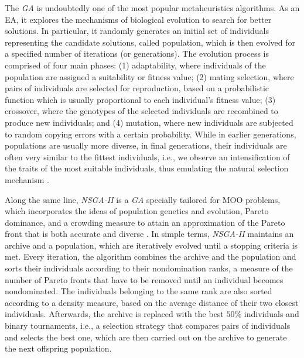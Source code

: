 	The \textit{\ac{GA}} is undoubtedly one of the most popular metaheuristics algorithms. As an \ac{EA}, it explores the mechanisms of biological evolution to search for better solutions. In particular, it randomly generates an initial set of individuals representing the candidate solutions, called population, which is then evolved for a specified number of iterations (or generations). The evolution process is comprised of four main phases: (1) adaptability, where individuals of the population are assigned a suitability or fitness value; (2) mating selection, where pairs of individuals are selected for reproduction, based on a probabilistic function which is usually proportional to each individual's fitness value; (3) crossover, where the genotypes of the selected individuals are recombined to produce new individuals; and (4) mutation, where new individuals are subjected to random copying errors with a certain probability. While in earlier generations, populations are usually more diverse, in final generations, their individuals are often very similar to the fittest individuals, i.e., we observe an intensification of the traits of the most suitable individuals, thus emulating the natural selection mechanism \cite{Brownlee2011}. %
	
	Along the same line, \textit{\ac{NSGA-II}} is a \textit{\ac{GA}} specially tailored for \ac{MOO} problems, which incorporates the ideas of population genetics and evolution, Pareto dominance, and a crowding measure to attain an approximation of the Pareto front that is both accurate and diverse \cite{Deb2002}. In simple terms, \textit{\ac{NSGA-II}} maintains an archive and a population, which are iteratively evolved until a stopping criteria is met. Every iteration, the algorithm combines the archive and the population and sorts their individuals according to their nondomination ranks, a measure of the number of Pareto fronts that have to be removed until an individual becomes nondominated. The individuals belonging to the same rank are also sorted according to a density measure, based on the average distance of their two closest individuals. Afterwards, the archive is replaced with the best $50\%$ individuals and binary tournaments, i.e., a selection strategy that compares pairs of individuals and selects the best one, which are then carried out on the archive to generate the next offspring population. 


